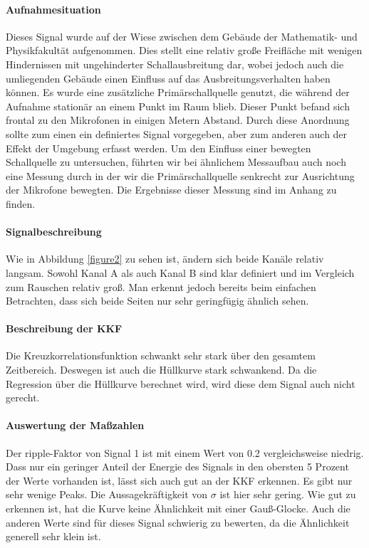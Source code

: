 \paragraph{Aufnahmesituation} Dieses Signal wurde auf der Wiese zwischen dem Gebäude der Mathematik- und Physikfakultät aufgenommen. Dies stellt eine relativ große Freifläche mit wenigen Hindernissen mit ungehinderter Schallausbreitung dar, wobei jedoch auch die umliegenden Gebäude einen Einfluss auf das Ausbreitungsverhalten haben können. Es wurde eine zusätzliche Primärschallquelle genutzt, die während der Aufnahme stationär an einem Punkt im Raum blieb. Dieser Punkt befand sich frontal zu den Mikrofonen in einigen Metern Abstand. Durch diese Anordnung sollte zum einen ein definiertes Signal vorgegeben, aber zum anderen auch der Effekt der Umgebung erfasst werden. 
Um den Einfluss einer bewegten Schallquelle zu untersuchen, führten wir bei ähnlichem Messaufbau auch noch eine Messung durch in der wir die Primärschallquelle senkrecht zur Ausrichtung der Mikrofone bewegten. Die Ergebnisse dieser Messung sind im Anhang zu finden.
\paragraph{Signalbeschreibung} Wie in Abbildung \ref{figure2} zu sehen ist, ändern sich beide Kanäle relativ langsam. Sowohl Kanal A als auch Kanal B sind klar definiert und im Vergleich zum Rauschen relativ groß. Man erkennt jedoch bereits beim einfachen Betrachten, dass sich beide Seiten nur sehr geringfügig ähnlich sehen.
\paragraph{Beschreibung der KKF} Die Kreuzkorrelationsfunktion schwankt sehr stark über den gesamtem Zeitbereich. Deswegen ist auch die Hüllkurve stark schwankend. Da die Regression über die Hüllkurve berechnet wird, wird diese dem Signal auch nicht gerecht.
\paragraph{Auswertung der Maßzahlen}
Der ripple-Faktor von Signal 1 ist mit einem Wert von 0.2 vergleichsweise niedrig. Dass nur ein geringer Anteil der Energie des Signals in den obersten 5 Prozent der Werte vorhanden ist, lässt sich auch gut an der KKF erkennen. Es gibt nur sehr wenige Peaks. Die Aussagekräftigkeit von $\sigma$ ist hier sehr gering. Wie gut zu erkennen ist, hat die Kurve keine Ähnlichkeit mit einer Gauß-Glocke. Auch die anderen Werte sind für dieses Signal schwierig zu bewerten, da die Ähnlichkeit generell sehr klein ist.
